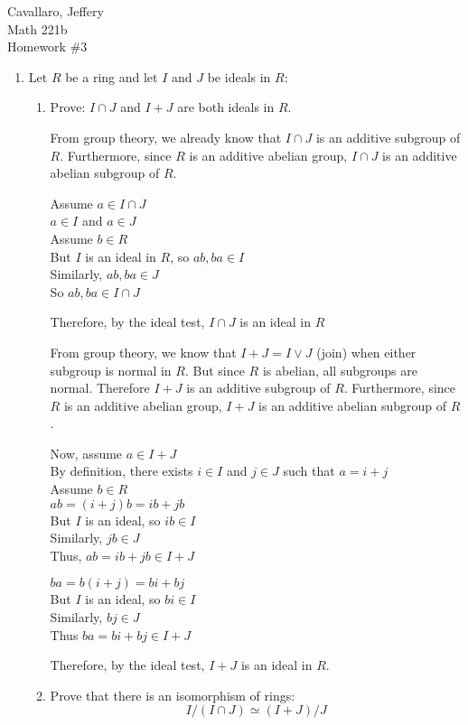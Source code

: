 \documentclass[letterpaper,12pt,fleqn]{article}
\begin{document}
Cavallaro, Jeffery \\
Math 221b \\
Homework \#3

\begin{enumerate}
\item Let $R$ be a ring and let $I$ and $J$ be ideals in $R$:
  \begin{enumerate}
  \item Prove: $I\cap J$ and $I+J$ are both ideals in $R$.

    From group theory, we already know that $I\cap J$ is an additive subgroup
    of $R$. Furthermore, since $R$ is an additive abelian group, $I\cap J$ is
    an additive abelian subgroup of $R$.

    Assume $a\in I\cap J$ \\
    $a\in I$ and $a\in J$ \\
    Assume $b\in R$ \\
    But $I$ is an ideal in $R$, so $ab,ba\in I$ \\
    Similarly, $ab,ba\in J$ \\
    So $ab,ba\in I\cap J$

    Therefore, by the ideal test, $I\cap J$ is an ideal in $R$

    From group theory, we know that $I+J=I\vee J$ (join) when either subgroup is
    normal in $R$. But since $R$ is abelian, all subgroups are normal.
    Therefore $I+J$ is an additive subgroup of $R$. Furthermore, since $R$ is
    an additive abelian group, $I+J$ is an additive abelian subgroup of $R$.

    Now, assume $a\in I+J$ \\
    By definition, there exists $i\in I$ and $j\in J$ such that $a=i+j$ \\
    Assume $b\in R$ \\
    $ab=(i+j)b=ib+jb$ \\
    But $I$ is an ideal, so $ib\in I$ \\
    Similarly, $jb\in J$ \\
    Thus,  $ab=ib+jb\in I+J$

    $ba=b(i+j)=bi+bj$ \\
    But $I$ is an ideal, so $bi\in I$ \\
    Similarly, $bj\in J$ \\
    Thus $ba=bi+bj\in I+J$

    Therefore, by the ideal test, $I+J$ is an ideal in $R$.

  \item Prove that there is an isomorphism of rings:
    \[I/(I\cap J)\simeq(I+J)/J\]


\end{enumerate}
\end{enumerate}
\end{document}
